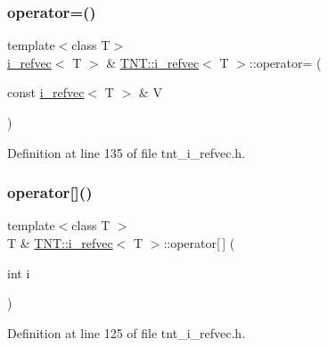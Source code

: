 \subsubsection{\texorpdfstring{operator=()}{operator=()}}
{\footnotesize\ttfamily template$<$class T$>$ \\
\hyperlink{classTNT_1_1i__refvec}{i\+\_\+refvec}$<$ T $>$ \& \hyperlink{classTNT_1_1i__refvec}{T\+N\+T\+::i\+\_\+refvec}$<$ T $>$\+::operator= (\begin{DoxyParamCaption}\item[{const \hyperlink{classTNT_1_1i__refvec}{i\+\_\+refvec}$<$ T $>$ \&}]{V }\end{DoxyParamCaption})\hspace{0.3cm}{\ttfamily [inline]}}



Definition at line 135 of file tnt\+\_\+i\+\_\+refvec.\+h.

\mbox{\label{classTNT_1_1i__refvec_ae72a1576302f9bbecd64cfc273c885c2}} 
\subsubsection{\texorpdfstring{operator[]()}{operator[]()}\hspace{0.1cm}{\footnotesize\ttfamily [1/2]}}
{\footnotesize\ttfamily template$<$class T $>$ \\
T \& \hyperlink{classTNT_1_1i__refvec}{T\+N\+T\+::i\+\_\+refvec}$<$ T $>$\+::operator\mbox{[}$\,$\mbox{]} (\begin{DoxyParamCaption}\item[{int}]{i }\end{DoxyParamCaption})\hspace{0.3cm}{\ttfamily [inline]}}



Definition at line 125 of file tnt\+\_\+i\+\_\+refvec.\+h.

\mbox{\label{classTNT_1_1i__refvec_a9e3ce316bf77e4297206dff1122305ad}} 
